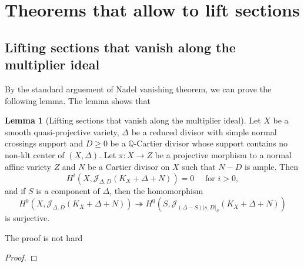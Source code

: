 \documentclass[11pt]{article}
\theoremstyle{definition}
\newtheorem{lemma}[theorem]{Lemma}
\begin{document}
	
	
	\section{Theorems that allow to lift sections}
	
	\subsection{Lifting sections that vanish along the multiplier ideal}
	By the standard arguement of Nadel vanishing theorem, we can prove the following lemma. The lemma shows that 
	\begin{lemma}[Lifting sections that vanish along the multiplier ideal]
		Let $X$ be a smooth quasi-projective variety, $\Delta$ be a reduced divisor with simple normal crossings support and $D \geq 0$ be a $\mathbb{Q}$-Cartier divisor whose support contains no non-klt center of $(X, \Delta)$. Let $\pi: X \rightarrow Z$ be a projective morphism to a normal affine variety $Z$ and $N$ be a Cartier divisor on $X$ such that $N-D$ is ample. Then
		$$
		H^i\left(X, \mathscr{J}_{\Delta, D}\left(K_X+\Delta+N\right)\right)=0 \quad \text { for } i>0,
		$$
		and if $S$ is a component of $\Delta$, then the homomorphism
		$$
		H^0\left(X, \mathscr{J}_{\Delta, D}\left(K_X+\Delta+N\right)\right) \twoheadrightarrow H^0\left(S, \mathscr{J}_{(\Delta-S)|s, D|_S}\left(K_X+\Delta+N\right)\right)
		$$
		is surjective.
	\end{lemma} 
	The proof is not hard
	\begin{proof}
		
	\end{proof}
	
\end{document}
